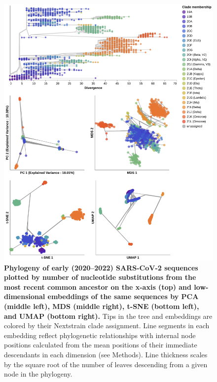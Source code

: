 \documentclass[10pt,letterpaper]{article}
\begin{document}
\begin{figure}[!h]
\includegraphics[width=\columnwidth]{figures/sarscov2-embeddings-by-Nextstrain_clade-clade.png}
\caption{{\bf Phylogeny of early (2020--2022) SARS-CoV-2 sequences plotted by number of nucleotide substitutions from the most recent common ancestor on the x-axis (top) and low-dimensional embeddings of the same sequences by PCA (middle left), MDS (middle right), t-SNE (bottom left), and UMAP (bottom right).}
  Tips in the tree and embeddings are colored by their Nextstrain clade assignment.
  Line segments in each embedding reflect phylogenetic relationships with internal node positions calculated from the mean positions of their immediate descendants in each dimension (see Methods).
  Line thickness scales by the square root of the number of leaves descending from a given node in the phylogeny.
}
\label{fig:sars-cov-2-early-embeddings-by-Nextstrain-clade}
\end{figure}
\end{document}
